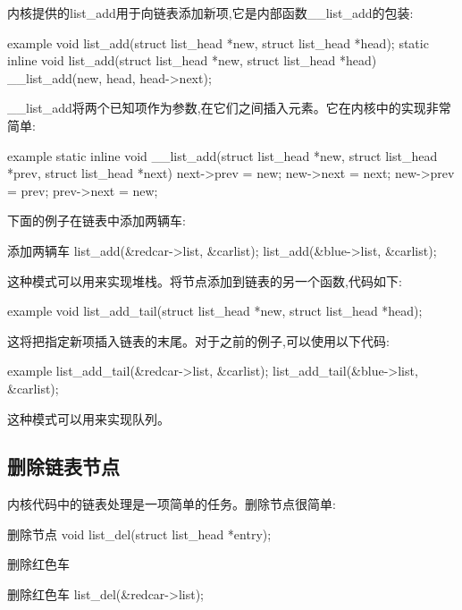 \documentclass[lang=cn,newtx,10pt,scheme=chinese]{elegantbook}
\begin{document}
内核提供的list\_add用于向链表添加新项,它是内部函数\_\_list\_add的包装:

\begin{mycode}{example}
void list_add(struct list_head *new, struct list_head *head);
static inline void list_add(struct list_head *new, struct list_head *head)
{
    __list_add(new, head, head->next);
}
\end{mycode}

\_\_list\_add将两个已知项作为参数,在它们之间插入元素。它在内核中的实现非常简单:

\begin{mycode}{example}
static inline void __list_add(struct list_head *new, struct list_head *prev, struct list_head *next)
{
    next->prev = new;
    new->next = next;
    new->prev = prev;
    prev->next = new;
}
\end{mycode}

下面的例子在链表中添加两辆车:

\begin{mycode}{添加两辆车}
list_add(&redcar->list, &carlist);
list_add(&blue->list, &carlist);
\end{mycode}

这种模式可以用来实现堆栈。将节点添加到链表的另一个函数,代码如下:

\begin{mycode}{example}
void list_add_tail(struct list_head *new, struct list_head *head);
\end{mycode}

这将把指定新项插入链表的末尾。对于之前的例子,可以使用以下代码:

\begin{mycode}{example}
list_add_tail(&redcar->list, &carlist);
list_add_tail(&blue->list, &carlist);
\end{mycode}

这种模式可以用来实现队列。

\subsection{删除链表节点}

内核代码中的链表处理是一项简单的任务。删除节点很简单:

\begin{mycode}{删除节点}
void list_del(struct list_head *entry);
\end{mycode}

删除红色车

\begin{mycode}{删除红色车}
list_del(&redcar->list);
\end{mycode}
\end{document}
